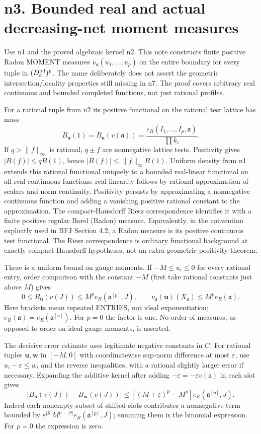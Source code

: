 \documentclass[
  11pt,
]{article}
\begin{document}
\section{n3. Bounded real and actual decreasing-net moment
measures}\label{n3.-bounded-real-and-actual-decreasing-net-moment-measures}

Use n1 and the proved algebraic kernel n2. This note constructs finite
positive Radon MOMENT measures \(\nu_{\mathfrak a}(u_1,\ldots,u_p)\) on
the entire boundary for every tuple in \((D^{\rm bd}_{\mathfrak a})^p\).
The name deliberately does not assert the geometric
intersection/locality properties still missing in n7. The proof covers
arbitrary real continuous and bounded completed functions, not just
rational profiles.

For a rational tuple from n2 its positive functional on the rational
test lattice has mass
\[B_{\boldsymbol u}(1)=B_{\boldsymbol u}(v(\mathfrak a))=\frac{e_R(I_1,\ldots,I_p,\mathfrak a)}{\prod k_i}.\]
If \(q>\|f\|_\infty\) is rational, \(q\pm f\) are nonnegative lattice
tests. Positivity gives \(|B(f)|\le qB(1)\), hence
\(|B(f)|\le\|f\|_\infty B(1)\). Uniform density from n1 extends this
rational functional uniquely to a bounded real-linear functional on all
real continuous functions: real linearity follows by rational
approximation of scalars and norm continuity. Positivity persists by
approximating a nonnegative continuous function and adding a vanishing
positive rational constant to the approximation. The compact-Hausdorff
Riesz correspondence identifies it with a finite positive regular Borel
(Radon) measure. Equivalently, in the convention explicitly used in BFJ
Section 4.2, a Radon measure is its positive continuous test functional.
The Riesz correspondence is ordinary functional background at exactly
compact Hausdorff hypotheses, not an extra geometric positivity theorem.

There is a uniform bound on gauge moments. If \(-M\le u_i\le0\) for
every rational entry, order comparison with the constant \(-M\) (first
take rational constants just above \(M\)) gives
\[0\le B_{\boldsymbol u}(v(J))\le M^p e_R(\mathfrak a^{[p]},J),\qquad \nu_{\mathfrak a}(\boldsymbol u)(X_{\mathfrak a})\le M^p e_R(\mathfrak a).\]
Here brackets mean repeated ENTRIES, not ideal exponentiation;
\(e_R(\mathfrak a)=e_R(\mathfrak a^{[n]})\). For \(p=0\) the factor is
one. No order of measures, as opposed to order on ideal-gauge moments,
is asserted.

The decisive error estimate uses legitimate negative constants in \(C\).
For rational tuples \(\boldsymbol u,\boldsymbol w\) in \([-M,0]\) with
coordinatewise sup-norm difference at most \(\varepsilon\), use
\(u_i-\varepsilon\le w_i\) and the reverse inequalities, with a rational
slightly larger error if necessary. Expanding the additive kernel after
adding \(-\varepsilon=-\varepsilon v(\mathfrak a)\) in each slot gives
\[\left|B_{\boldsymbol u}(v(J))-B_{\boldsymbol w}(v(J))\right|\le [(M+\varepsilon)^p-M^p]e_R(\mathfrak a^{[p]},J).\tag{1}\]
Indeed each nonempty subset of shifted slots contributes a nonnegative
term bounded by \(\varepsilon^{|S|}M^{p-|S|}e_R(\mathfrak a^{[p]},J)\);
summing them is the binomial expression. For \(p=0\) the expression is
zero.
\end{document}

